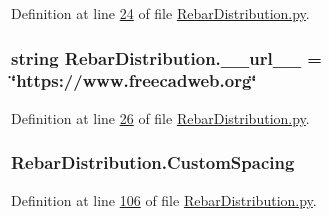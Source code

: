 Definition at line \hyperlink{RebarDistribution_8py_source_l00024}{24} of file \hyperlink{RebarDistribution_8py_source}{Rebar\+Distribution.\+py}.

\subsubsection[{\texorpdfstring{\+\_\+\+\_\+url\+\_\+\+\_\+}{__url__}}]{\setlength{\rightskip}{0pt plus 5cm}string Rebar\+Distribution.\+\_\+\+\_\+url\+\_\+\+\_\+ = \char`\"{}https\+://www.\+freecadweb.\+org\char`\"{}\hspace{0.3cm}{\ttfamily [private]}}\hypertarget{namespaceRebarDistribution_a61d261a603c7a127f83af9b7516547c5}{}\label{namespaceRebarDistribution_a61d261a603c7a127f83af9b7516547c5}


Definition at line \hyperlink{RebarDistribution_8py_source_l00026}{26} of file \hyperlink{RebarDistribution_8py_source}{Rebar\+Distribution.\+py}.

\subsubsection[{\texorpdfstring{Custom\+Spacing}{CustomSpacing}}]{\setlength{\rightskip}{0pt plus 5cm}Rebar\+Distribution.\+Custom\+Spacing}\hypertarget{namespaceRebarDistribution_a6572ac63b9c553f99eeb53e19f7b4e7c}{}\label{namespaceRebarDistribution_a6572ac63b9c553f99eeb53e19f7b4e7c}


Definition at line \hyperlink{RebarDistribution_8py_source_l00106}{106} of file \hyperlink{RebarDistribution_8py_source}{Rebar\+Distribution.\+py}.

